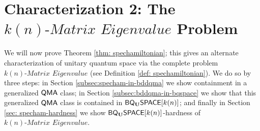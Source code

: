 \documentclass[11pt]{article}
\theoremstyle{definition}
\newtheorem{definition}[theorem]{Definition}
\theoremstyle{remark}
\newcommand\QMA{{\sf{QMA}}}
\newcommand\QMAexp{{\sf{PreciseQMA}}}
\newcommand\spechamiltonian[1]{#1\textit{-Matrix Eigenvalue}}
\newcommand{\classfont}{\sf}
\newcommand{\Unitary}{\mathbf{U}}
\newcommand{\unitaryBQSPACE}[1]{{\classfont{BQ}_\Unitary\classfont{SPACE}}[#1]}
\newcommand\bigoh{\mathcal{O}}
\begin{document}
\section{Characterization 2: The $\spechamiltonian{k(n)}$ Problem}
We will now prove Theorem \ref{thm: spechamiltonian}; this gives an alternate characterization of unitary quantum space via the complete problem $\spechamiltonian{k(n)}$ (see Definition \ref{def: spechamiltonian}). We do so by three steps: in Section \ref{subsec:specham-in-bddqma} we show containment in a generalized $\QMA$ class; in Section \ref{subsec:bddqma-in-bqspace} we show that this generalized $\QMA$ class is contained in $\unitaryBQSPACE{k(n)}$; and finally in Section \ref{sec: specham-hardness} we show $\unitaryBQSPACE{k(n)}$-hardness of $\spechamiltonian{k(n)}$.
\end{document}
